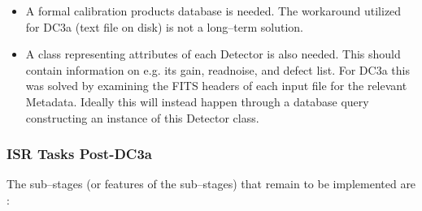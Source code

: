 \begin{itemize}
\item A formal calibration products database is needed.  The workaround 
utilized for DC3a (text file on disk) is not a long--term solution.

\item A class representing attributes of each Detector is also needed.  
This should contain information on e.g. its gain, readnoise, and
defect list.  For DC3a this was solved by examining the FITS headers of
each input file for the relevant Metadata.  Ideally this will instead
happen through a database query constructing an instance of this
Detector class.


\end{itemize}

\subsubsection{ISR Tasks Post-DC3a}

The sub--stages (or features of the sub--stages) that remain to be
implemented are :

